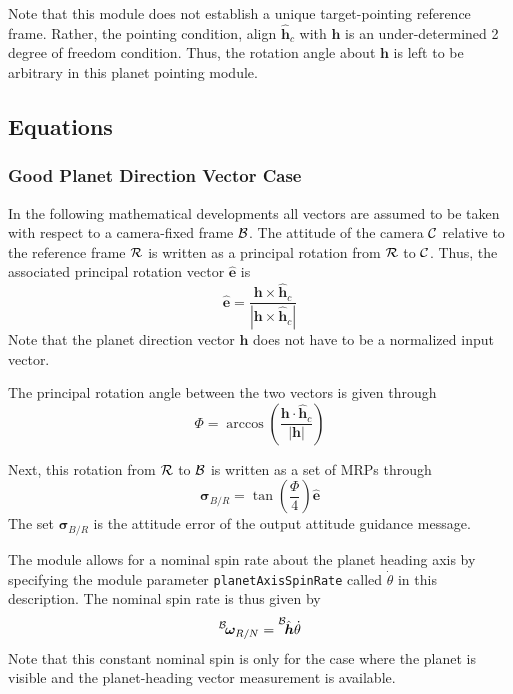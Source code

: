 Note that this module does not establish a unique target-pointing reference frame.  Rather, the pointing condition, align $\hat{\bm h}_{c}$ with $\bm h$ is an under-determined 2 degree of freedom condition.  Thus, the rotation angle about $\bm h$ is left to be arbitrary in this planet pointing module. 

\subsection{Equations}
\subsubsection{Good Planet Direction Vector Case}\label{sec:withHeading}
In the following mathematical developments all vectors are assumed to be taken with respect to a camera-fixed frame $\cal B$.  The attitude of the camera $\cal C$ relative to the reference frame $\cal R$ is written as a principal rotation from $\cal R$ to $\cal C$.  Thus, the associated principal rotation vector $\hat{\bm e}$ is
\begin{equation}
	\label{eq:ssp:1}
	\hat{\bm e} = \frac{\bm h \times \hat{\bm h}_{c}}{|\bm h \times \hat{\bm h}_{c}|}
\end{equation}
Note that the planet direction vector $\bm h$ does not have to be a normalized input vector.  

The principal rotation angle between the two vectors is given through
\begin{equation}
	\label{eq:ssp:2}
	\Phi = \arccos \left( \frac{\bm h  \cdot \hat{\bm h}_{c} }{|\bm h|} \right)
\end{equation}

Next, this rotation from $\cal R$ to $\cal B$ is written as a set of MRPs through
\begin{equation}
	\label{eq:ssp:3}
	\bm\sigma_{B/R} = \tan\left(\frac{\Phi}{4}\right) \hat{\bm e}
\end{equation}
The set $\bm\sigma_{B/R}$ is the attitude error of the output attitude guidance message.  

The module allows for a nominal spin rate about the planet heading axis by specifying the module parameter {\tt planetAxisSpinRate} called $\dot \theta$ in this description.  The nominal spin rate is thus given by
\begin{equation}
	\leftexp{B}{\bm\omega}_{R/N} = \leftexp{B}{\hat{\bm h}} \dot\theta
\end{equation}
Note that this constant nominal spin is only for the case where the planet is visible and the planet-heading vector measurement is available. 

